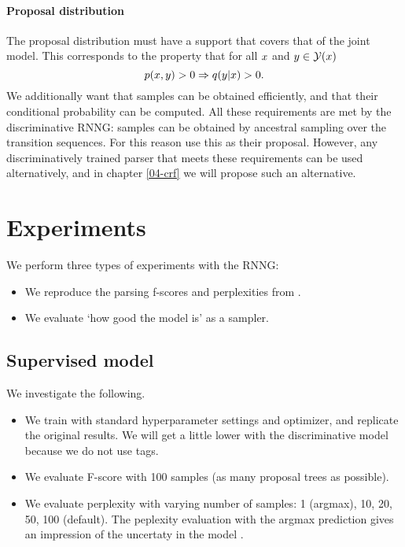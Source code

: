 \paragraph{Proposal distribution}
The proposal distribution must have a support that covers that of the joint model. This corresponds to the property that for all $x$ and $y \in \mathcal{Y}(x)$
\begin{equation*}
  p(x, y) > 0 \Rightarrow q( y| x ) > 0.
\end{equation*}
We additionally want that samples can be obtained efficiently, and that their conditional probability can be computed. All these requirements are met by the discriminative RNNG: samples can be obtained by ancestral sampling over the transition sequences. For this reason \citet{dyer2016rnng} use this as their proposal. However, any discriminatively trained parser that meets these requirements can be used alternatively, and in chapter \ref{04-crf} we will propose such an alternative.

\section{Experiments}
We perform three types of experiments with the RNNG:
\begin{itemize}
  \item We reproduce the parsing f-scores and perplexities from \citep{dyer2016rnng}.
  \item We evaluate `how good the model is' as a sampler.
\end{itemize}

\subsection{Supervised model} We investigate the following.
\begin{itemize}
  \item We train with standard hyperparameter settings and optimizer, and replicate the original results. We will get a little lower with the discriminative model because we do not use tags.
  \item We evaluate F-score with 100 samples (as many proposal trees as possible).
  \item We evaluate perplexity with varying number of samples: 1 (argmax), 10, 20, 50, 100 (default). The peplexity evaluation with the argmax prediction gives an impression of the uncertaty in the model \citep{buys2018exact}.
\end{itemize}

